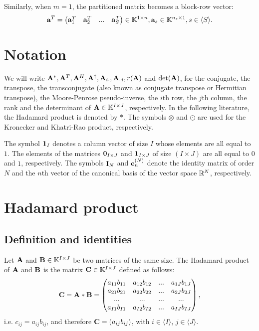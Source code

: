Similarly, when $m=1$, the partitioned matrix becomes a block-row vector:
\begin{align*}
    \bold{a}^{T}=\begin{pmatrix}
        \bold{a}_1^T&\bold{a}_2^T&...&\bold{a}_S^T
    \end{pmatrix}\in \mathbb{K}^{1\times n}, \bold{a}_s\in\mathbb{K}^{n_s\times 1},s\in\langle S\rangle.
\end{align*}

\section{Notation}
We will write $\bold{A}^*,\bold{A}^T,\bold{A}^H,\bold{A}^{\dagger},\bold{A}_{i\cdot},\bold{A}_{\cdot j},r(\bold{A})$ 
and $\text{det}(\bold{A})$, for the conjugate, the transpose,
the transconjugate (also known as conjugate transpose or Hermitian transpose),
the Moore-Penrose pseudo-inverse, the $i$th row, the $j$th column,
the rank and the determinant of $\bold{A}\in\mathbb{K}^{I\times J}$, respectively.
In the following literature, the Hadamard product is denoted by $*$.
The symbols $\otimes$ and $\odot$ are used for the Kronecker and Khatri-Rao product, respectively.
\par
The symbol $\bold{1}_I$ denotes a column vector of size $I$
whose elements are all equal to $1$. 
The elements of the matrices $\bold{0}_{I\times J}$ and
$\bold{1}_{I\times J}$ of size $(I\times J)$ are all equal to $0$
and $1$, respectively. The symbols $\bold{I}_N$ and $\bold{e}_n^{(N)}$
denote the identity matrix of order $N$ and the $n$th vector of 
the canonical basis of the vector space $\mathbb{R}^N$, respectively.


\section{Hadamard product}

\subsection{Definition and identities}
\begin{definition}{}{}
    Let $\bold{A}$ and $\bold{B}\in \mathbb{K}^{I\times J}$ be two matrices of the same size.
    The Hadamard product of $\bold{A}$ and $\bold{B}$ is the
    matrix $\bold{C}\in\mathbb{K}^{I\times J}$ defined as follows:
    \begin{align*}
        \bold{C}=\bold{A}*\bold{B}=\begin{pmatrix}
            a_{11}b_{11}& a_{12}b_{12}& ... & a_{1J}b_{1J}\\
            a_{21}b_{21}& a_{22}b_{22}& ... & a_{2J}b_{2J}\\
            ...& ... & ... & ...\\
            a_{I1}b_{I1}& a_{I2}b_{I2} & ...& a_{IJ}b_{IJ}
        \end{pmatrix},
    \end{align*}
    i.e. $c_{ij}=a_{ij}b_{ij}$, and therefore $\bold{C}=(a_{ij}b_{ij})$, with $i\in\langle I\rangle$, $j\in\langle J\rangle$.
\end{definition}

